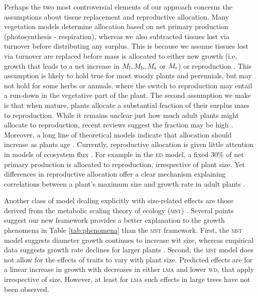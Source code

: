 \documentclass[9pt,twocolumn,twoside,lineno]{pnas-new}
\newcommand{\lma}{\textsc{lma}}
\newcommand{\wood}{\textsc{wd}}
\begin{document}
Perhaps the two most controversial elements of our approach concerns the assumptions about tissue replacement and reproductive allocation. Many vegetation models determine allocation based on net primary production (photosynthesis - respiration), whereas we also subtracted tissues lost via turnover before distributing any surplus. This is because we assume tissues lost via turnover are replaced before mass is allocated to either new growth (i.e. growth that leads to a net increase in $M_{\rm l}, M_{\rm b}, M_{\rm s}$ or $M_{\rm r}$) or reproduction \citep{Thornley-2000}. This assumption is likely to hold true for most woody plants and perennials, but may not hold for some herbs or annuals, where the switch to reproduction may entail a run-down in the vegetative part of the plant. The second assumption we make is that when mature, plants allocate a substantial fraction of their surplus mass to reproduction. While it remains unclear just how much adult plants might allocate to reproduction, recent reviews suggest the fraction may be high \citep{Thomas-2011, Wenk-2015}. Moreover, a long line of theoretical models indicate that allocation should increase as plants age \citep[reviewed by ][]{Wenk-2015}. Currently, reproductive allocation is given little attention in models of ecosystem flux \citep[e.g.][]{Sitch-2008, DeKauwe-2014}. For example in the \textsc{ed} model, a fixed 30\% of net primary production is allocated to reproduction, irrespective of plant size. Yet differences in reproductive allocation offer a clear mechanism explaining correlations between a plant's maximum size and growth rate in adult plants \citep[e.g.][]{Wright-2010}.

Another class of model dealing explicitly with size-related effects are those derived from the metabolic scaling theory  of ecology (\textsc{mst}) \citep{Enquist-1999, Enquist-2007}. Several points suggest our new framework provides a better explanation to the growth phenomena in Table \ref{tab:phenomena} than the \textsc{mst} framework. First, the \textsc{mst} model suggests diameter growth continues to increase wit size, whereas empirical data suggests growth rate declines for larger plants \citep{Canham-2004, Canham-2006, Herault-2011}. Second, the \textsc{mst} model does not allow for the effects of traits to vary with plant size. Predicted effects are for a linear increase in growth with decreases in either {\lma} and lower {\wood}, that apply irrespective of size. However, at least for {\lma} such effects in large trees have not been observed.
\end{document}
